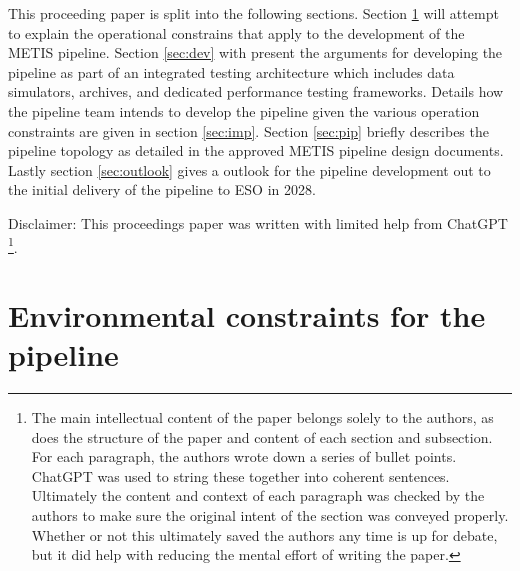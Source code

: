\documentclass[a4paper]{spie}  %
\begin{document}
This proceeding paper is split into the following sections. Section \ref{sec:env} will attempt to explain the operational constrains that apply to the development of the METIS pipeline. Section \ref{sec:dev} with present the arguments for developing the pipeline as part of an integrated testing architecture which includes data simulators, archives, and dedicated performance testing frameworks. Details how the pipeline team intends to develop the pipeline given the various operation constraints are given in section \ref{sec:imp}. Section \ref{sec:pip} briefly describes the pipeline topology as detailed in the approved METIS pipeline design documents. Lastly section  \ref{sec:outlook} gives a outlook for the pipeline development out to the initial delivery of the pipeline to ESO in 2028.

Disclaimer: This proceedings paper was written with limited help from ChatGPT \footnote{The main intellectual content of the paper belongs solely to the authors, as does the structure of the paper and content of each section and subsection. For each paragraph, the authors wrote down a series of bullet points. ChatGPT was used to string these together into coherent sentences. Ultimately the content and context of each paragraph was checked by the authors to make sure the original intent of the section was conveyed properly. Whether or not this ultimately saved the authors any time is up for debate, but it did help with reducing the mental effort of writing the paper.}.

\section{Environmental constraints for the pipeline}
\label{sec:env}

\end{document}
